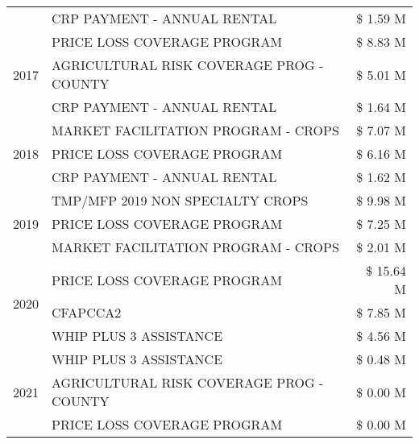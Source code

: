 \begin{tabular}{llr}
 & CRP PAYMENT - ANNUAL RENTAL & \$ 1.59 M \\
\cline{1-3}
\multirow[t]{3}{*}{2017} & PRICE LOSS COVERAGE PROGRAM & \$ 8.83 M \\
 & AGRICULTURAL RISK COVERAGE PROG - COUNTY & \$ 5.01 M \\
 & CRP PAYMENT - ANNUAL RENTAL & \$ 1.64 M \\
\cline{1-3}
\multirow[t]{3}{*}{2018} & MARKET FACILITATION PROGRAM - CROPS & \$ 7.07 M \\
 & PRICE LOSS COVERAGE PROGRAM & \$ 6.16 M \\
 & CRP PAYMENT - ANNUAL RENTAL & \$ 1.62 M \\
\cline{1-3}
\multirow[t]{3}{*}{2019} & TMP/MFP 2019 NON SPECIALTY CROPS & \$ 9.98 M \\
 & PRICE LOSS COVERAGE PROGRAM & \$ 7.25 M \\
 & MARKET FACILITATION PROGRAM - CROPS & \$ 2.01 M \\
\cline{1-3}
\multirow[t]{3}{*}{2020} & PRICE LOSS COVERAGE PROGRAM & \$ 15.64 M \\
 & CFAPCCA2 & \$ 7.85 M \\
 & WHIP PLUS 3 ASSISTANCE & \$ 4.56 M \\
\cline{1-3}
\multirow[t]{3}{*}{2021} & WHIP PLUS 3 ASSISTANCE & \$ 0.48 M \\
 & AGRICULTURAL RISK COVERAGE PROG - COUNTY & \$ 0.00 M \\
 & PRICE LOSS COVERAGE PROGRAM & \$ 0.00 M \\
\cline{1-3}
\bottomrule
\end{tabular}
